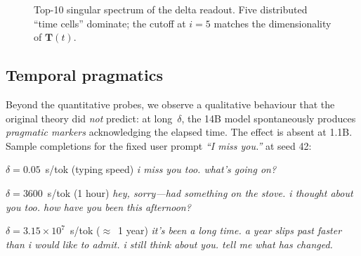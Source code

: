 \documentclass[10pt,twocolumn,letterpaper]{article}
\begin{document}
\begin{figure}[H]
\centering
{}
\caption{Top-10 singular spectrum of the delta readout. Five distributed ``time cells'' dominate; the cutoff at $i=5$ matches the dimensionality of $\mathbf{T}(t)$.}
\label{fig:svd}
\end{figure}

\subsection{Temporal pragmatics}

Beyond the quantitative probes, we observe a qualitative behaviour that the original theory did \emph{not} predict: at long~$\delta$, the 14B model spontaneously produces \emph{pragmatic markers} acknowledging the elapsed time. The effect is absent at 1.1B. Sample completions for the fixed user prompt \emph{``I miss you.''} at seed 42:

\begin{pragbox}{{$\delta = 0.05$~s/tok (typing speed)}}
\small\itshape
i miss you too. what's going on?
\end{pragbox}
\begin{pragbox}{{$\delta = 3600$~s/tok (1 hour)}}
\small\itshape
hey, sorry---had something on the stove. i thought about you too. how have you been this afternoon?
\end{pragbox}
\begin{pragbox}{{$\delta = 3.15\!\times\!10^{7}$~s/tok ($\approx$~1 year)}}
\small\itshape
it's been a long time. a year slips past faster than i would like to admit. i still think about you. tell me what has changed.
\end{pragbox}
\end{document}
